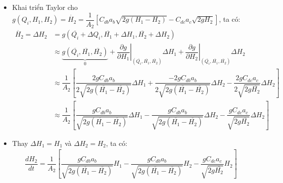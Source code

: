 \documentclass[12pt,a4paper]{article}
\begin{document}
\begin{enumerate}[\it a.]
\begin{itemize}
\begin{itemize}
                            \item Khai triển Taylor cho $g\left({Q_i, H_1, H_2}\right) = \dot{H_2} = \dfrac{1}{A_2} \left[{C_{db}a_b\sqrt{2g(H_1 - H_2)} - C_{dc}a_c\sqrt{2gH_2}}\right]$, ta có:
                                \begin{align}
                                    \dot{H_2} = \Delta H_2 & = g\left({\overline{Q_i} + \Delta Q_i, \overline{H_1} + \Delta H_1, \overline{H_2} + \Delta H_2}\right) \\
                                    & \approx \underbrace{g\left({ \overline{Q_i}, \overline{H_1}, \overline{H_2}}\right)}_{0} + \left.\dfrac{\partial g}{\partial H_1}\right|_{ \left({ \overline{Q_i}, \overline{H_1}, \overline{H_2}}\right)} \Delta H_1 + \left.\dfrac{\partial g}{\partial H_2}\right|_{ \left({ \overline{Q_i}, \overline{H_1}, \overline{H_2}}\right)} \Delta H_2\\
                                    & \approx \dfrac{1}{A_2} \left[{\dfrac{2g C_{db}a_b}{2 \sqrt{2g(\overline{H_1} - \overline{H_2})}} \Delta H_1 + \dfrac{-2g C_{db}a_b}{2 \sqrt{2g(\overline{H_1} - \overline{H_2})}} \Delta H_2 - \dfrac{2g C_{dc}a_c}{2 \sqrt{2g\overline{H_2}}} \Delta H_2 }\right]\\
                                    & \approx \dfrac{1}{A_2} \left[{\dfrac{g C_{db}a_b}{\sqrt{2g(\overline{H_1} - \overline{H_2})}} \Delta H_1 - \dfrac{g C_{db}a_b}{ \sqrt{2g(\overline{H_1} - \overline{H_2})}} \Delta H_2 - \dfrac{g C_{dc}a_c}{\sqrt{2g\overline{H_2}}} \Delta H_2 }\right]
                                \end{align}

                            \item Thay $\Delta H_1= H_1$ và $\Delta H_2 = H_2$, ta có:
                                \begin{align}
                                    \dfrac{d H_2}{dt} = \dfrac{1}{A_2} \left[{\dfrac{g C_{db}a_b}{\sqrt{2g(\overline{H_1} - \overline{H_2})}} H_1 - \dfrac{g C_{db}a_b}{ \sqrt{2g(\overline{H_1} - \overline{H_2})}} H_2 - \dfrac{g C_{dc}a_c}{\sqrt{2g\overline{H_2}}} H_2 }\right]
                                \end{align}
                        \end{itemize}


\end{itemize}
\end{enumerate}
\end{document}
